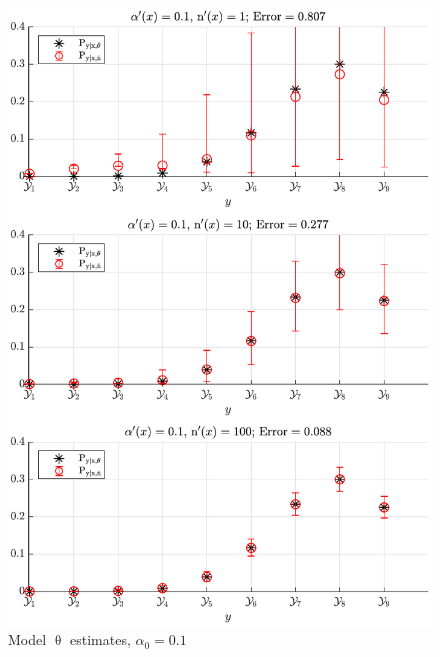 \documentclass[conference]{IEEEtran}
\begin{document}
\begin{figure}
\centering
\includegraphics[width=1\linewidth]{P_yx_error_a0_0_1.pdf}
\caption{Model $\uptheta$ estimates, $\alpha_0 = 0.1$}
\label{fig:P_yx_error_a0_0_1}
\end{figure}
\end{document}
